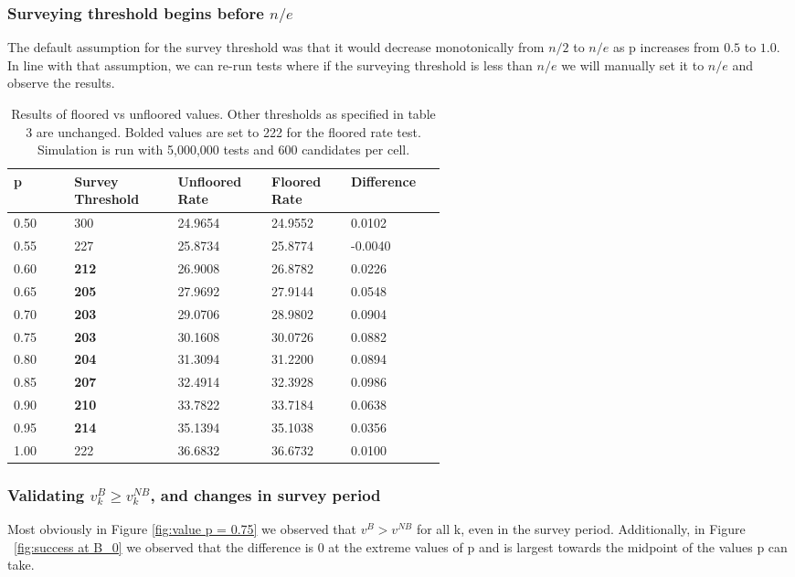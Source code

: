 \documentclass[a4paper,11pt]{article}
\begin{document}
\subsubsection{Surveying threshold begins before $n/e$}

The default assumption for the survey threshold was that it would decrease monotonically from $n/2$ to $n/e$ as p increases from $0.5$ to $1.0$. In line with that assumption, we can re-run tests where if the surveying threshold is less than $n/e$ we will manually set it to $n/e$ and observe the results.
\begin{table}[h]
\centering
\begin{tabular}
{|p{0.10\linewidth}|p{0.15\linewidth}|p{0.10\linewidth}|p{0.10\linewidth}|p{0.10\linewidth}|}
\hline
p&Survey Threshold &Unfloored Rate&Floored Rate&Difference\\
\hline
0.50 & 300 & 24.9654 & 24.9552 & 0.0102 \\
0.55 & 227& 25.8734 & 25.8774 & -0.0040 \\
0.60 & \textbf{212}& 26.9008 & 26.8782 & 0.0226 \\
0.65 & \textbf{205} & 27.9692 & 27.9144 & 0.0548 \\
0.70 & \textbf{203} & 29.0706 & 28.9802 & 0.0904 \\
0.75 & \textbf{203} & 30.1608 & 30.0726 & 0.0882 \\
0.80 & \textbf{204} & 31.3094 & 31.2200 & 0.0894 \\
0.85 & \textbf{207} & 32.4914 & 32.3928 & 0.0986 \\
0.90 & \textbf{210} & 33.7822 & 33.7184 & 0.0638 \\
0.95 & \textbf{214} & 35.1394 & 35.1038 & 0.0356 \\
1.00 & 222 & 36.6832 & 36.6732 & 0.0100 \\
\hline
\end{tabular}
\caption{Results of floored vs unfloored values. Other thresholds as specified in table 3 are unchanged. Bolded values are set to 222 for the floored rate test. Simulation is run with 5,000,000 tests and 600 candidates per cell.}
\end{table}
\subsubsection{Validating $v_k^B \ge v_k^{NB}$, and changes in survey period}

Most obviously in Figure \ref{fig:value p = 0.75} we observed that $v^B > v^{NB}$ for all k, even in the survey period. Additionally, in Figure ~\ref{fig:success at B_0} we observed that the difference is 0 at the extreme values of p and is largest towards the midpoint of the values p can take.
\end{document}
